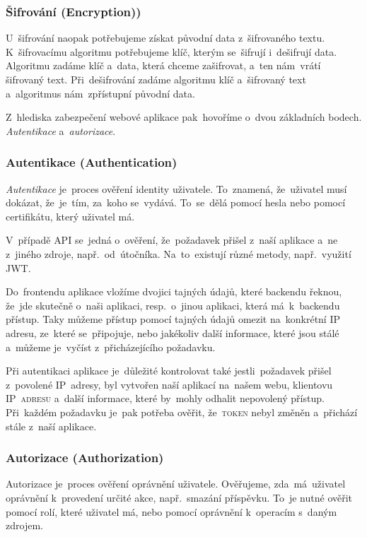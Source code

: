 \documentclass[14pt,a4paper]{article}
\begin{document}
        \subsubsection{Šifrování (Encryption))}
        U~šifrování naopak potřebujeme získat původní data z~šifrovaného textu. K~šifrovacímu algoritmu potřebujeme klíč, kterým se~šifrují i~dešifrují data. Algoritmu zadáme klíč a~data, která chceme zašifrovat, a~ten nám~vrátí šifrovaný text. Při~dešifrování zadáme algoritmu klíč a~šifrovaný text a~algoritmus nám~zpřístupní původní data.

        Z~hlediska zabezpečení webové aplikace pak~hovoříme o~dvou základních bodech. \emph{Autentikace} a~\emph{autorizace}.

            \subsubsection{Autentikace (Authentication)}
            \emph{Autentikace} je~proces ověření identity uživatele. To~znamená, že~uživatel musí dokázat, že~je~tím, za~koho se~vydává. To~se~dělá pomocí hesla nebo pomocí certifikátu, který uživatel má.
            
            V~případě \textsc{API} se~jedná o~ověření, že~požadavek přišel z~naší aplikace a~ne z~jiného zdroje, např.~od~útočníka. Na~to~existují různé metody, např.~využití \textsc{JWT}.
            
            Do~frontendu aplikace vložíme dvojici tajných údajů, které backendu řeknou, že~jde skutečně o~naši aplikaci, resp.~o~jinou aplikaci, která má~k~backendu přístup. Taky můžeme přístup pomocí tajných údajů omezit na~konkrétní IP adresu, ze~které se~připojuje, nebo jakékoliv další informace, které jsou stálé a~můžeme je~vyčíst z~přicházejícího požadavku.

            Při autentikaci aplikace je~důležité kontrolovat také jestli~požadavek přišel z~povolené IP~adresy, byl vytvořen naší aplikací na~našem webu, klientovu \textsc{IP~adresu} a~další informace, které by~mohly odhalit nepovolený přístup. Při~každém požadavku je~pak potřeba ověřit, že~\textsc{token} nebyl změněn a~přichází stále z~naší aplikace. \cite{graham2021ethical}
            
            \subsubsection{Autorizace (Authorization)}
            Autorizace je~proces ověření oprávnění uživatele. Ověřujeme, zda~má~uživatel oprávnění k~provedení určité akce, např.~smazání příspěvku.
            To~je nutné ověřit pomocí rolí, které uživatel má, nebo pomocí oprávnění k~operacím s~daným zdrojem.
\end{document}
